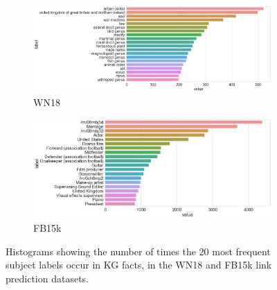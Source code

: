 \begin{figure}[H]
	\begin{subfigure}[b]{.5\linewidth}
   		\centering
    		\includegraphics[width=1.0\linewidth, height=0.6\linewidth]{WN18_Subject_Counts}
		\captionsetup{justification=centering}
		\caption{WN18}
	\end{subfigure}
	\begin{subfigure}[b]{.5\linewidth}
   		\centering
		\includegraphics[width=1.0\linewidth, height=0.6\linewidth]{FB15k_Subject_Counts}
		\captionsetup{justification=centering}
		\caption{FB15k}
	\end{subfigure}
	\caption{Histograms showing the number of times the 20 most frequent subject labels occur in KG facts, in the WN18 and FB15k link prediction datasets.}
\end{figure}



